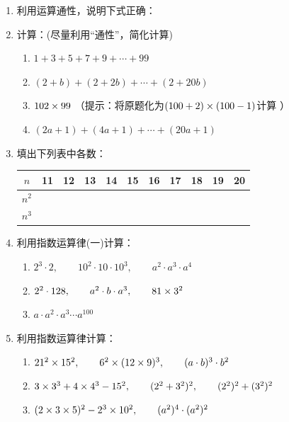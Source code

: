 \begin{enumerate}
\item 利用运算通性，说明下式正确：
\begin{enumerate}
   
\end{enumerate}

\item 计算：(尽量利用“通性”，简化计算)
\begin{enumerate}
    \item $1+3+5+7+9+\cdots+99$
    \item $(2+b)+(2+2b)+\cdots+(2+20b)$
    \item $102\times 99$ （提示：将原题化为$(100+2)\times(100-1)$计算 ）
    \item $(2a+1)+(4a+1)+\cdots +(20a+1)$
\end{enumerate}

\item 填出下列表中各数：
\begin{center}
    \begin{tabular}{c|cccccccccc}
        \hline
        $n$ & 11&12&13&14&15&16&17&18&19&20\\
\hline
$n^2$\\
$n^3$\\
        \hline
    \end{tabular}
\end{center}

\item 利用指数运算律(一)计算：
\begin{enumerate}
    \item $2^3\cdot 2,\qquad 10^2\cdot 10\cdot 10^3,\qquad a^2\cdot a^3\cdot a^4$
    \item $2^2\cdot 128,\qquad a^2\cdot b\cdot a^3,\qquad 81\times 3^2$
    \item $a\cdot a^2\cdot a^3\cdots a^{100}$
\end{enumerate}

\item 利用指数运算律计算：
\begin{enumerate}
    \item $21^2\times 15^2,\qquad 6^2\times(12\times 9)^3,\qquad (a\cdot b)^3\cdot b^2$
    \item $3\times 3^3+4\times 4^3-15^2,\qquad (2^2+3^2)^2,\qquad (2^2)^2+(3^2)^2$
    \item $(2\times3\times5)^2-2^3\times10^2,\qquad (a^2)^4\cdot (a^2)^2$
\end{enumerate}


\end{enumerate}
